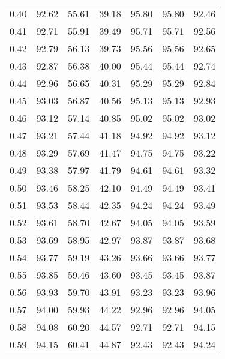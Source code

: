 \begin{tabular}{|c|c|c|c|c|c|c|}
      0.40 &     92.62 &     55.61 &      39.18 &   95.80 &      95.80 &         92.46 \\
      0.41 &     92.71 &     55.91 &      39.49 &   95.71 &      95.71 &         92.56 \\
      0.42 &     92.79 &     56.13 &      39.73 &   95.56 &      95.56 &         92.65 \\
      0.43 &     92.87 &     56.38 &      40.00 &   95.44 &      95.44 &         92.74 \\
      0.44 &     92.96 &     56.65 &      40.31 &   95.29 &      95.29 &         92.84 \\
      0.45 &     93.03 &     56.87 &      40.56 &   95.13 &      95.13 &         92.93 \\
      0.46 &     93.12 &     57.14 &      40.85 &   95.02 &      95.02 &         93.02 \\
      0.47 &     93.21 &     57.44 &      41.18 &   94.92 &      94.92 &         93.12 \\
      0.48 &     93.29 &     57.69 &      41.47 &   94.75 &      94.75 &         93.22 \\
      0.49 &     93.38 &     57.97 &      41.79 &   94.61 &      94.61 &         93.32 \\
      0.50 &     93.46 &     58.25 &      42.10 &   94.49 &      94.49 &         93.41 \\
      0.51 &     93.53 &     58.44 &      42.35 &   94.24 &      94.24 &         93.49 \\
      0.52 &     93.61 &     58.70 &      42.67 &   94.05 &      94.05 &         93.59 \\
      0.53 &     93.69 &     58.95 &      42.97 &   93.87 &      93.87 &         93.68 \\
      0.54 &     93.77 &     59.19 &      43.26 &   93.66 &      93.66 &         93.77 \\
      0.55 &     93.85 &     59.46 &      43.60 &   93.45 &      93.45 &         93.87 \\
      0.56 &     93.93 &     59.70 &      43.91 &   93.23 &      93.23 &         93.96 \\
      0.57 &     94.00 &     59.93 &      44.22 &   92.96 &      92.96 &         94.05 \\
      0.58 &     94.08 &     60.20 &      44.57 &   92.71 &      92.71 &         94.15 \\
      0.59 &     94.15 &     60.41 &      44.87 &   92.43 &      92.43 &         94.24 \\

\end{tabular}
